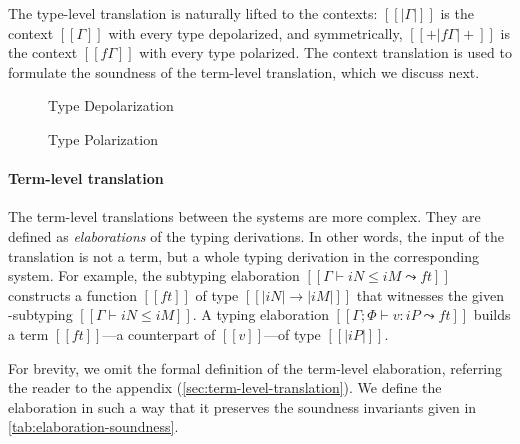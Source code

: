 The type-level translation is naturally lifted to the contexts:
$[[|Γ|]]$ is the context $[[Γ]]$ with every type depolarized,
and symmetrically, $[[+|fΓ|+]]$ is the context $[[fΓ]]$ with every type polarized.
The context translation is used to formulate the soundness of the
 term-level translation, which we discuss next.


\begin{figure}[t]
  \begin{minipage}[t]{0.60\linewidth}
    \centering
      \begin{minipage}[t]{0.30\linewidth}
      \ottfundefnunpolP{}
      \end{minipage}
      \hspace{0.5cm}
      \begin{minipage}[t]{0.30\linewidth}
      \ottfundefnunpolN{}
      \end{minipage}
    \caption{Type Depolarization \protect\footnotemark}
    \label{fig:depolarization}
  \end{minipage}
  \hspace{0.3cm}
  \begin{minipage}[t]{0.3\linewidth}
    \centering
    \ottfundefnpolarP{}
    \caption{Type Polarization}
    \label{fig:polarization}
  \end{minipage}
\end{figure}



\paragraph*{Term-level translation}

The term-level translations between the systems are more complex. They are
defined as \emph{elaborations} of the typing derivations. In other words, the
input of the translation is not a term, but a whole typing derivation in the
corresponding system. For example, the subtyping elaboration $[[Γ ⊢ iN ≤ iM ⤳
ft]]$ constructs a \systemf function $[[ft]]$ of type $[[|iN| → |iM|]]$ that
witnesses the given \fexists-subtyping $[[Γ ⊢ iN ≤ iM]]$. A typing elaboration
$[[Γ; Φ ⊢ v : iP ⤳ ft]]$ builds a term $[[ft]]$---a \systemf counterpart of
$[[v]]$---of type $[[|iP|]]$.

For brevity, we omit the formal definition of the term-level elaboration,
referring the reader to the appendix (\cref{sec:term-level-translation}). We define
the elaboration in such a way that it preserves the soundness invariants given
in \cref{tab:elaboration-soundness}. 


